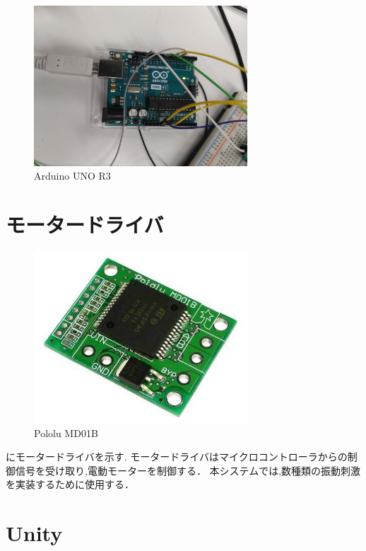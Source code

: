 \begin{figure}[h]
\centering
\includegraphics[clip,width=8cm]{./fig/Arduino.png}
\caption{Arduino UNO R3}\label{arduino}
\end{figure}

\newpage

\section{モータードライバ}

\begin{figure}[h]
\centering
\includegraphics[clip,width=8cm]{./fig/pololuMD01B.png}
\caption{Pololu MD01B}\label{polo}
\end{figure}

にモータードライバを示す.
モータードライバはマイクロコントローラからの制御信号を受け取り,電動モーターを制御する．
本システムでは,数種類の振動刺激を実装するために使用する．

\newpage

\section{Unity}

